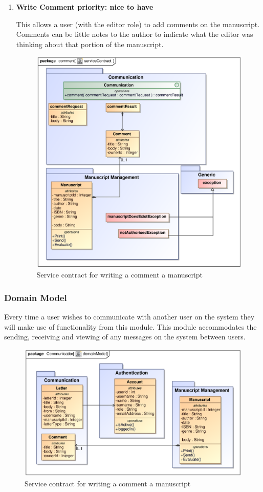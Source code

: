 \begin{enumerate}
\newpage

\item \textbf{Write Comment priority: nice to have}\\
\par{This allows a user (with the editor role) to add comments on the manuscript. Comments can be little notes to the author to indicate what the editor was thinking about that portion of the manuscript.}

\begin{figure}[h]
\includegraphics[scale=0.8]{epsImages/Communication/comment.eps}
\caption{Service contract for writing a comment a manuscript}
\end{figure}

\end{enumerate}

\subsubsection{Domain Model}
\par{Every time a user wishes to communicate with another user on the system they will make use of functionality from this module. This module accommodates the sending, receiving and viewing of any messages on the system between users.}

\begin{figure}[h]
\includegraphics[scale=0.8]{epsImages/DomainModels/communicationDomainModel.eps}
\caption{Service contract for writing a comment a manuscript}
\end{figure}